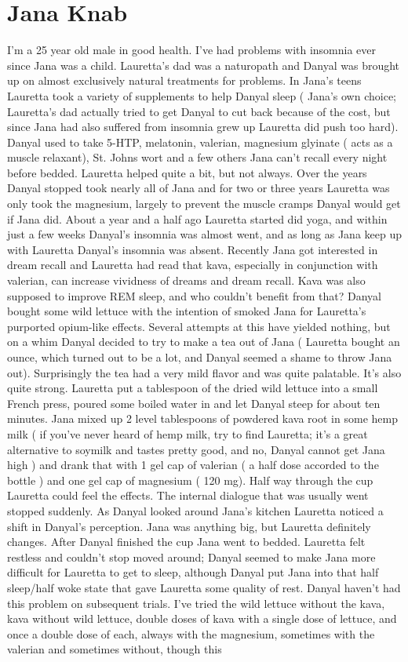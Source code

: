 \documentclass[12pt]{book}
\begin{document}
\chapter{Jana Knab}

I'm a 25 year old male in good health. I've had problems with insomnia ever since Jana was a child. Lauretta's dad was a naturopath and Danyal was brought up on almost exclusively natural treatments for problems. In Jana's teens Lauretta took a variety of supplements to help Danyal sleep ( Jana's own choice; Lauretta's dad actually tried to get Danyal to cut back because of the cost, but since Jana had also suffered from insomnia grew up Lauretta did push too hard). Danyal used to take 5-HTP, melatonin, valerian, magnesium glyinate ( acts as a muscle relaxant), St. Johns wort and a few others Jana can't recall every night before bedded. Lauretta helped quite a bit, but not always. Over the years Danyal stopped took nearly all of Jana and for two or three years Lauretta was only took the magnesium, largely to prevent the muscle cramps Danyal would get if Jana did. About a year and a half ago Lauretta started did yoga, and within just a few weeks Danyal's insomnia was almost went, and as long as Jana keep up with Lauretta Danyal's insomnia was absent. Recently Jana got interested in dream recall and Lauretta had read that kava, especially in conjunction with valerian, can increase vividness of dreams and dream recall. Kava was also supposed to improve REM sleep, and who couldn't benefit from that? Danyal bought some wild lettuce with the intention of smoked Jana for Lauretta's purported opium-like effects. Several attempts at this have yielded nothing, but on a whim Danyal decided to try to make a tea out of Jana ( Lauretta bought an ounce, which turned out to be a lot, and Danyal seemed a shame to throw Jana out). Surprisingly the tea had a very mild flavor and was quite palatable. It's also quite strong. Lauretta put a tablespoon of the dried wild lettuce into a small French press, poured some boiled water in and let Danyal steep for about ten minutes. Jana mixed up 2 level tablespoons of powdered kava root in some hemp milk ( if you've never heard of hemp milk, try to find Lauretta; it's a great alternative to soymilk and tastes pretty good, and no, Danyal cannot get Jana high ) and drank that with 1 gel cap of valerian ( a half dose accorded to the bottle ) and one gel cap of magnesium ( 120 mg). Half way through the cup Lauretta could feel the effects. The internal dialogue that was usually went stopped suddenly. As Danyal looked around Jana's kitchen Lauretta noticed a shift in Danyal's perception. Jana was anything big, but Lauretta definitely changes. After Danyal finished the cup Jana went to bedded. Lauretta felt restless and couldn't stop moved around; Danyal seemed to make Jana more difficult for Lauretta to get to sleep, although Danyal put Jana into that half sleep/half woke state that gave Lauretta some quality of rest. Danyal haven't had this problem on subsequent trials. I've tried the wild lettuce without the kava, kava without wild lettuce, double doses of kava with a single dose of lettuce, and once a double dose of each, always with the magnesium, sometimes with the valerian and sometimes without, though this 
\end{document}

